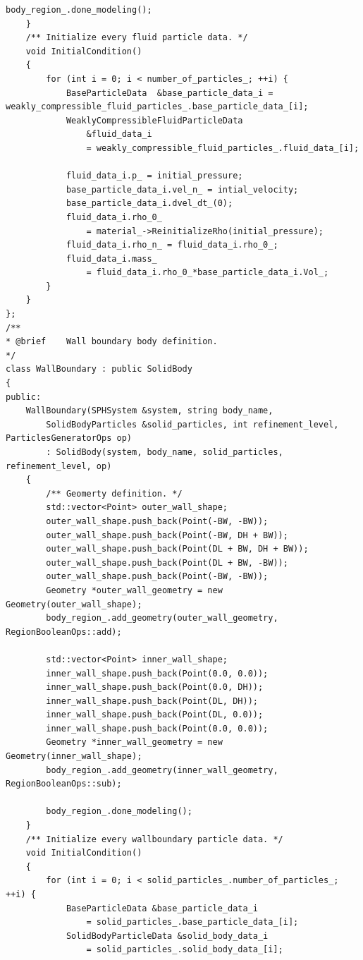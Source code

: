 \documentclass[12pt, a4paper,onecolumn]{article}
\begin{document}
\begin{lstlisting}[basicstyle=\ttfamily\footnotesize]
		body_region_.done_modeling();
	}
	/** Initialize every fluid particle data. */
	void InitialCondition()
	{
		for (int i = 0; i < number_of_particles_; ++i) {
			BaseParticleData  &base_particle_data_i = weakly_compressible_fluid_particles_.base_particle_data_[i];
			WeaklyCompressibleFluidParticleData 
				&fluid_data_i
				= weakly_compressible_fluid_particles_.fluid_data_[i];

			fluid_data_i.p_ = initial_pressure;
			base_particle_data_i.vel_n_ = intial_velocity;
			base_particle_data_i.dvel_dt_(0);
			fluid_data_i.rho_0_
				= material_->ReinitializeRho(initial_pressure);
			fluid_data_i.rho_n_ = fluid_data_i.rho_0_;
			fluid_data_i.mass_
				= fluid_data_i.rho_0_*base_particle_data_i.Vol_;
		}
	}
};
/**
* @brief 	Wall boundary body definition.
*/
class WallBoundary : public SolidBody
{
public:
	WallBoundary(SPHSystem &system, string body_name,
		SolidBodyParticles &solid_particles, int refinement_level, ParticlesGeneratorOps op)
		: SolidBody(system, body_name, solid_particles, refinement_level, op)
	{
		/** Geomerty definition. */
		std::vector<Point> outer_wall_shape;
		outer_wall_shape.push_back(Point(-BW, -BW));
		outer_wall_shape.push_back(Point(-BW, DH + BW));
		outer_wall_shape.push_back(Point(DL + BW, DH + BW));
		outer_wall_shape.push_back(Point(DL + BW, -BW));
		outer_wall_shape.push_back(Point(-BW, -BW));
		Geometry *outer_wall_geometry = new Geometry(outer_wall_shape);
		body_region_.add_geometry(outer_wall_geometry, RegionBooleanOps::add);

		std::vector<Point> inner_wall_shape;
		inner_wall_shape.push_back(Point(0.0, 0.0));
		inner_wall_shape.push_back(Point(0.0, DH));
		inner_wall_shape.push_back(Point(DL, DH));
		inner_wall_shape.push_back(Point(DL, 0.0));
		inner_wall_shape.push_back(Point(0.0, 0.0));
		Geometry *inner_wall_geometry = new Geometry(inner_wall_shape);
		body_region_.add_geometry(inner_wall_geometry, RegionBooleanOps::sub);

		body_region_.done_modeling();
	}
	/** Initialize every wallboundary particle data. */
	void InitialCondition()
	{
		for (int i = 0; i < solid_particles_.number_of_particles_; ++i) {
			BaseParticleData &base_particle_data_i
				= solid_particles_.base_particle_data_[i];
			SolidBodyParticleData &solid_body_data_i
				= solid_particles_.solid_body_data_[i];
	

\end{lstlisting}
\end{document}
